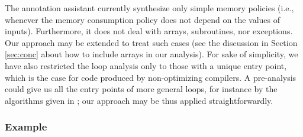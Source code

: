 
The annotation assistant currently synthesize only simple
memory policies (i.e., whenever the memory consumption policy does not depend on
the values of inputs).
Furthermore, it does not deal with arrays, subroutines, nor exceptions. Our approach may be extended to treat such cases (see the discussion in Section \ref{sec:conc} about how to include arrays in our analysis). For sake of simplicity,
we have also restricted the loop analysis only to those with a unique
entry point, which is the case for code produced by non-optimizing
compilers. A pre-analysis could give us all the entry points of more
general loops, for instance by the algorithms given in \cite{CJPS05cmu}; our approach may be thus applied straightforwardly.

\subsubsection{Example}

